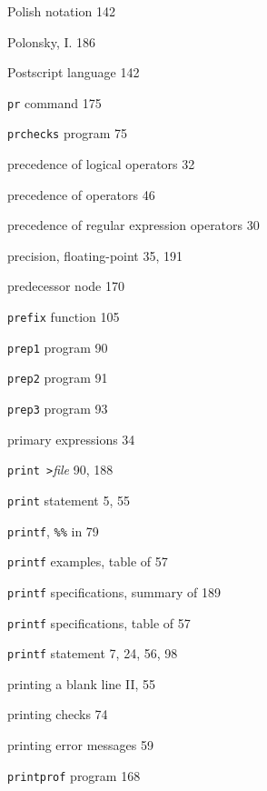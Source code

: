 \begin{multicols}{3}
\hangindent=3pc  Polish notation 142

\hangindent=3pc  Polonsky, I. 186

\hangindent=3pc  Postscript language 142

\hangindent=3pc  \verb'pr' command 175

\hangindent=3pc  \verb'prchecks' program 75

\hangindent=3pc  precedence of logical operators 32

\hangindent=3pc  precedence of operators 46

\hangindent=3pc  precedence of regular expression operators 30

\hangindent=3pc  precision, floating-point 35, 191

\hangindent=3pc  predecessor node 170

\hangindent=3pc  \verb'prefix' function 105

\hangindent=3pc  \verb'prep1' program 90

\hangindent=3pc  \verb'prep2' program 91

\hangindent=3pc  \verb'prep3' program 93

\hangindent=3pc  primary expressions 34

\hangindent=3pc  \verb'print >'\textit{file} 90, 188

\hangindent=3pc  \verb'print' statement 5, 55

\hangindent=3pc  \verb'printf', \verb'%%' in 79

\hangindent=3pc  \verb'printf' examples, table of 57

\hangindent=3pc  \verb'printf' specifications, summary of 189


\hangindent=3pc  \verb'printf' specifications, table of 57


\hangindent=3pc  \verb'printf' statement 7, 24, 56, 98

\hangindent=3pc  printing a blank line II, 55

\hangindent=3pc  printing checks 74

\hangindent=3pc  printing error messages 59

\hangindent=3pc  \verb'printprof' program 168


\end{multicols}

